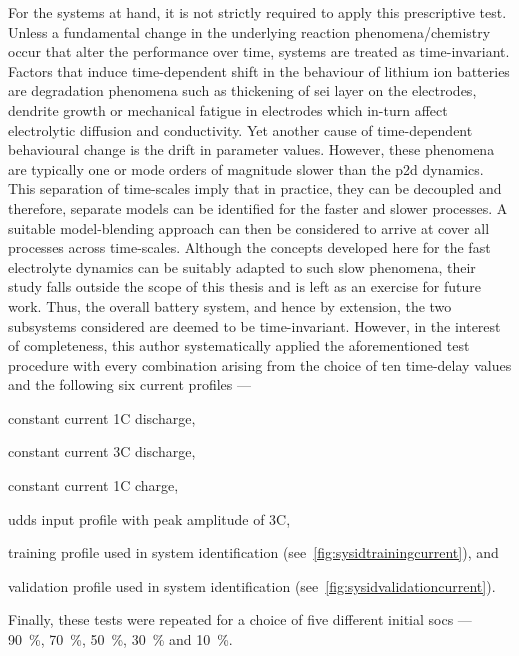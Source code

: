 For  the  systems   at  hand,  it  is  not  strictly   required  to  apply  this
prescriptive  test.  Unless a  fundamental  change  in the  underlying  reaction
phenomena/chemistry  occur that  alter the  performance over  time, systems  are
treated  as time-invariant.  Factors  that induce  time-dependent  shift in  the
behaviour of lithium ion batteries  are degradation phenomena such as thickening
of \gls{sei} layer  on the electrodes, dendrite growth or  mechanical fatigue in
electrodes  which in-turn  affect electrolytic  diffusion and  conductivity. Yet
another cause  of time-dependent  behavioural change is  the drift  in parameter
values. However, these  phenomena are typically one or mode  orders of magnitude
slower than  the \gls{p2d} dynamics.  This separation of
time-scales  imply  that in  practice,  they  can  be decoupled  and  therefore,
separate  models can  be  identified  for the  faster  and  slower processes.  A
suitable model-blending approach  can then be considered to arrive  at cover all
processes across time-scales. Although the  concepts developed here for the fast
electrolyte dynamics can be suitably adapted to such slow phenomena, their study
falls outside  the scope of this  thesis and is  left as an exercise  for future
work.  Thus,  the overall  battery  system,  and  hence  by extension,  the  two
subsystems considered are deemed to  be time-invariant. However, in the interest
of  completeness, this  author  systematically applied  the aforementioned  test
procedure  with every  combination arising  from  the choice  of ten  time-delay
values and the following six current profiles ---
\begin{enumerate*}[label=\emph{\alph*})]
    \item constant current 1C discharge,
    \item constant current 3C discharge,
    \item constant current 1C charge,
    \item \gls{udds} input profile with peak amplitude of 3C,
    \item training profile used in system identification (see~\cref{fig:sysidtrainingcurrent}), and
    \item validation profile used in system identification (see~\cref{fig:sysidvalidationcurrent}).
\end{enumerate*}
Finally,  these tests  were repeated  for a  choice of  five different  initial
\glspl{soc}   ---   \SI{90}{\percent},   \SI{70}{\percent},   \SI{50}{\percent},
\SI{30}{\percent} and \SI{10}{\percent}.

